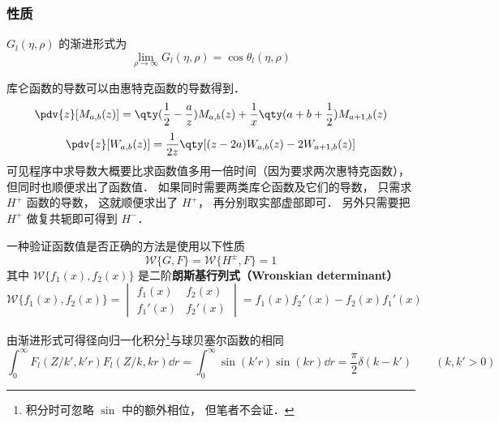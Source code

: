 \subsubsection{性质}
$G_l(\eta,\rho)$ 的渐进形式为
\begin{equation}
\lim_{\rho\to \infty} G_l(\eta, \rho) = \cos\theta_l(\eta, \rho)
\end{equation}

库仑函数的导数可以由惠特克函数的导数得到．
\begin{equation}
\pdv{z} [M_{a, b}(z)] = \qty(\frac12 - \frac{a}{z}) M_{a, b}(z) + \frac{1}{x} \qty(a + b + \frac12) M_{a+1, b}(z)
\end{equation}
\begin{equation}
\pdv{z} [W_{a, b}(z)] = \frac{1}{2z} \qty[(z - 2a) W_{a, b}(z) - 2W_{a+1, b}(z)]
\end{equation}
可见程序中求导数大概要比求函数值多用一倍时间（因为要求两次惠特克函数）， 但同时也顺便求出了函数值． 如果同时需要两类库仑函数及它们的导数， 只需求 $H^+$ 函数的导数， 这就顺便求出了 $H^+$， 再分别取实部虚部即可． 另外只需要把 $H^+$ 做复共轭即可得到 $H^-$．

一种验证函数值是否正确的方法是使用以下性质
\begin{equation}
\mathcal{W}\{G, F\} = \mathcal{W}\{H^\pm, F\} = 1
\end{equation}
其中 $\mathcal{W}\{f_1(x), f_2(x)\}$ 是二阶\textbf{朗斯基行列式（Wronskian determinant）}
\begin{equation}
\mathcal{W}\{f_1(x), f_2(x)\} = \begin{vmatrix}
f_1(x)  & f_2(x) \\
f_1'(x) & f_2'(x)
\end{vmatrix} = f_1(x) f_2'(x) - f_2(x) f_1'(x)
\end{equation}


由渐进形式可得径向归一化积分\footnote{积分时可忽略 $\sin$ 中的额外相位， 但笔者不会证．}与球贝塞尔函数的相同
\begin{equation}
\int_0^\infty F_l(Z/k', k' r)F_l(Z/k, kr) \dd{r} = \int_0^\infty \sin(k'r)\sin(kr) \dd{r} = \frac{\pi}{2}\delta(k - k') \qquad (k, k' > 0)
\end{equation}
